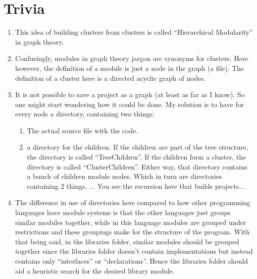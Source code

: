 \documentclass{article}
\begin{document}
\section{Trivia}

\begin{enumerate}
    \item This idea of building clusters from clusters is called “Hierarchical Modularity” in graph theory.

    \item Confusingly, modules in graph theory jargon are synonyms for clusters. Here however, the definition of a module is just a node in the graph (a file). The definition of a cluster here is a directed acyclic graph of nodes.
    
    \item It is not possible to save a project as a graph (at least as far as I know). So one might start wondering how it could be done. My solution is to have for every node a directory, containing two things:
    
    \begin{enumerate}
        \item The actual source file with the code.

        \item a directory for the children. If the children are part of the tree structure, the directory is called “TreeChildren”. If the children form a cluster, the directory is called “ClusterChildren”. Either way, that directory contains a bunch of children module nodes. Which in turn are directories containing 2 things, ... You see the recursion here that builds projects...
    
    \end{enumerate}
    
    \item The difference in use of directories here compared to how other programming languages have module systems is that the other languages just groups similar modules together, while in this language modules are grouped under restrictions and these groupings make for the structure of the program. With that being said, in the libraries folder, similar modules should be grouped together since the libraries folder doesn’t contain implementations but instead contains only “interfaces” or “declarations”. Hence the libraries folder should aid a heuristic search for the desired library module.
    
\end{enumerate}
\end{document}
